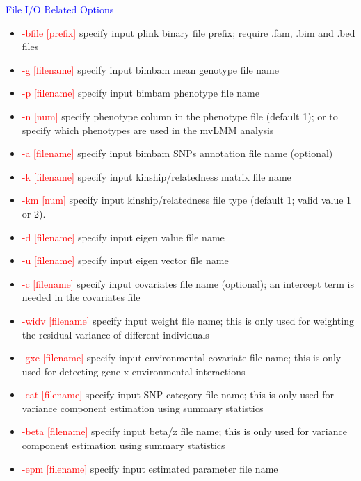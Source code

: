\documentclass[11pt]{article}
\begin{document}
\textcolor{blue}{File I/O Related Options}
%
\begin{itemize}
\item \textcolor{red}{-bfile    [prefix]}          \quad specify input plink binary file prefix; require .fam, .bim and .bed files
\item \textcolor{red}{-g        [filename]}      \quad specify input bimbam mean genotype file name
\item  \textcolor{red}{-p        [filename]}      \quad specify input bimbam phenotype file name
\item  \textcolor{red}{-n        [num]}      \quad specify phenotype column in the phenotype file (default 1); or to specify which phenotypes are used in the mvLMM analysis
\item  \textcolor{red}{-a        [filename]}      \quad specify input bimbam SNPs annotation file name (optional)
\item  \textcolor{red}{ -k        [filename]}     \quad  specify input kinship/relatedness matrix file name
\item  \textcolor{red}{ -km       [num]}     \quad           specify input kinship/relatedness file type (default 1; valid value 1 or 2).
\item  \textcolor{red}{ -d        [filename]}     \quad  specify input eigen value file name
\item  \textcolor{red}{ -u        [filename]}     \quad  specify input eigen vector file name
\item  \textcolor{red}{ -c        [filename] }     \quad      specify input covariates file name (optional); an intercept term is needed in the covariates file
\item  \textcolor{red}{ -widv        [filename] }     \quad      specify input weight file name; this is only used for weighting the residual variance of different individuals
\item  \textcolor{red}{ -gxe        [filename] }     \quad      specify input environmental covariate file name; this is only used for detecting gene x environmental interactions
\item  \textcolor{red}{ -cat        [filename] }     \quad      specify input SNP category file name; this is only used for variance component estimation using summary statistics
\item  \textcolor{red}{ -beta        [filename] }     \quad      specify input beta/z file name; this is only used for variance component estimation using summary statistics
\item  \textcolor{red}{ -epm        [filename] }     \quad    specify input estimated parameter file name

\end{itemize}
\end{document}
